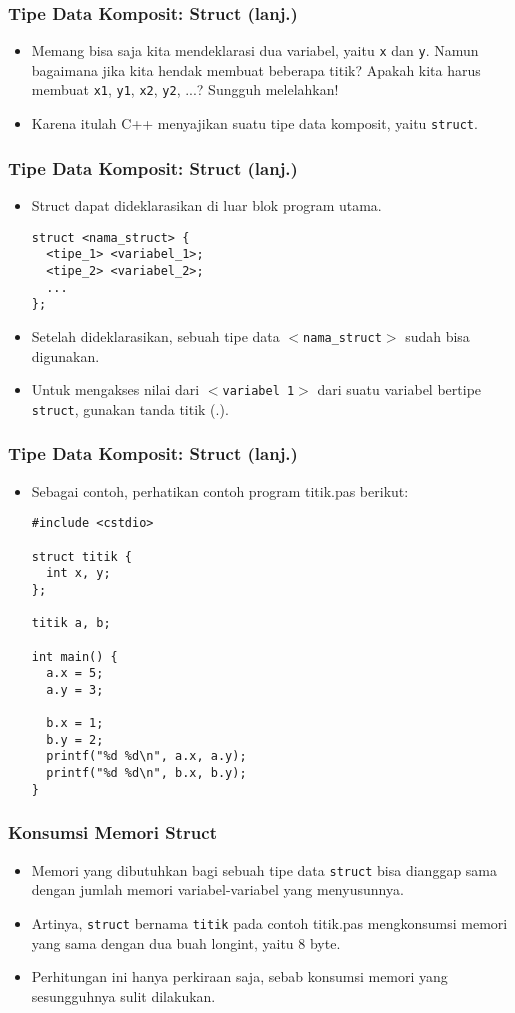 \begin{frame}
\frametitle{Tipe Data Komposit: Struct (lanj.)}
\begin{itemize}
  \item Memang bisa saja kita mendeklarasi dua variabel, yaitu \texttt{x} dan \texttt{y}. Namun bagaimana jika kita hendak membuat beberapa titik? Apakah kita harus membuat \texttt{x1}, \texttt{y1}, \texttt{x2}, \texttt{y2}, ...? Sungguh melelahkan!
  \item Karena itulah C++ menyajikan suatu tipe data komposit, yaitu \alert{\texttt{struct}}.
\end{itemize}
\end{frame}

\begin{frame}[fragile]
\frametitle{Tipe Data Komposit: Struct (lanj.)}
\begin{itemize}
  \item Struct dapat dideklarasikan di luar blok program utama.
\begin{lstlisting}
struct <nama_struct> {
  <tipe_1> <variabel_1>;
  <tipe_2> <variabel_2>;
  ...
};
\end{lstlisting}
  \item Setelah dideklarasikan, sebuah tipe data \texttt{$<$nama\_struct$>$} sudah bisa digunakan.
  \item Untuk mengakses nilai dari \texttt{$<$variabel 1$>$} dari suatu variabel bertipe \texttt{struct}, gunakan tanda titik (.).
\end{itemize}
\end{frame}

\begin{frame}[fragile]
\frametitle{Tipe Data Komposit: Struct (lanj.)}
\begin{itemize}
  \item Sebagai contoh, perhatikan contoh program titik.pas berikut:
\begin{lstlisting}
#include <cstdio>

struct titik {
  int x, y;
};

titik a, b;

int main() {
  a.x = 5;
  a.y = 3;
  
  b.x = 1;
  b.y = 2;
  printf("%d %d\n", a.x, a.y);
  printf("%d %d\n", b.x, b.y);
}
\end{lstlisting}
\end{itemize}
\end{frame}

\begin{frame}
\frametitle{Konsumsi Memori Struct}
\begin{itemize}
  \item Memori yang dibutuhkan bagi sebuah tipe data \texttt{struct} bisa dianggap sama dengan jumlah memori variabel-variabel yang menyusunnya.
  \item Artinya, \texttt{struct} bernama \texttt{titik} pada contoh titik.pas mengkonsumsi memori yang sama dengan dua buah longint, yaitu 8 byte.
  \item Perhitungan ini hanya perkiraan saja, sebab konsumsi memori yang sesungguhnya sulit dilakukan.
\end{itemize}
\end{frame}

